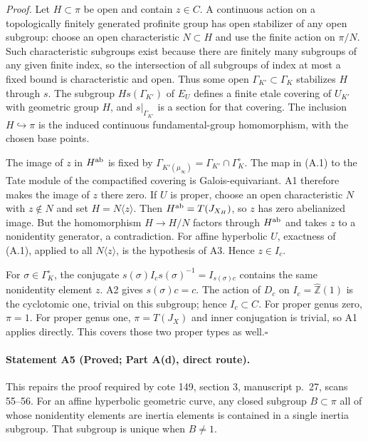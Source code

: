 \emph{Proof.} Let $H\subset\pi$ be open and contain $z\in C$. A continuous action on a topologically finitely generated profinite group has open stabilizer of any open subgroup: choose an open characteristic $N\subset H$ and use the finite action on $\pi/N$. Such characteristic subgroups exist because there are finitely many subgroups of any given finite index, so the intersection of all subgroups of index at most a fixed bound is characteristic and open. Thus some open $\Gamma_{K'}\subset\Gamma_K$ stabilizes $H$ through $s$. The subgroup $H s(\Gamma_{K'})$ of $E_U$ defines a finite etale covering of $U_{K'}$ with geometric group $H$, and $s|_{\Gamma_{K'}}$ is a section for that covering. The inclusion $H\hookrightarrow\pi$ is the induced continuous fundamental-group homomorphism, with the chosen base points.

The image of $z$ in $H^{\rm ab}$ is fixed by
$\Gamma_{K'(\mu_\infty)}=\Gamma_{K'}\cap\Gamma_K^\circ$. The map in (A.1) to the Tate module of the compactified covering is Galois-equivariant. A1 therefore makes the image of $z$ there zero. If $U$ is proper, choose an open characteristic $N$ with $z\notin N$ and set $H=N\langle z\rangle$. Then $H^{\rm ab}=T(J_{X_H})$, so $z$ has zero abelianized image. But the homomorphism $H\to H/N$ factors through $H^{\rm ab}$ and takes $z$ to a nonidentity generator, a contradiction. For affine hyperbolic $U$, exactness of (A.1), applied to all $N\langle z\rangle$, is the hypothesis of A3. Hence $z\in I_c$.

For $\sigma\in\Gamma_K^\circ$, the conjugate $s(\sigma)I_cs(\sigma)^{-1}=I_{s(\sigma)c}$ contains the same nonidentity element $z$. A2 gives $s(\sigma)c=c$. The action of $D_c$ on $I_c=\widehat{\mathbb Z}(1)$ is the cyclotomic one, trivial on this subgroup; hence $I_c\subset C$. For proper genus zero, $\pi=1$. For proper genus one, $\pi=T(J_X)$ and inner conjugation is trivial, so A1 applies directly. This covers those two proper types as well.\hfill$\square$

\paragraph{Statement A5 (Proved; Part A(d), direct route).}\label{res:A5}
This repairs the proof required by cote 149, section 3, manuscript p.~27, scans 55--56.
For an affine hyperbolic geometric curve, any closed subgroup $B\subset\pi$ all of whose nonidentity elements are inertia elements is contained in a single inertia subgroup. That subgroup is unique when $B\ne1$.

